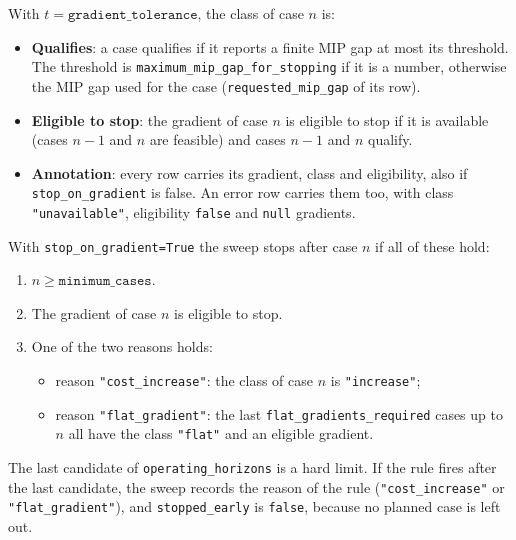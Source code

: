 With $t = \texttt{gradient\_tolerance}$, the class of case $n$ is:
\tabend

\begin{itemize}[nosep,leftmargin=1.5em]
  \item \textbf{Qualifies}: a case qualifies if it reports a finite MIP gap at most its threshold. The threshold is \texttt{maximum\_mip\_gap\_for\_stopping} if it is a number, otherwise the MIP gap used for the case (\texttt{requested\_mip\_gap} of its row).
  \item \textbf{Eligible to stop}: the gradient of case $n$ is eligible to stop if it is available (cases $n-1$ and $n$ are feasible) and cases $n-1$ and $n$ qualify.
  \item \textbf{Annotation}: every row carries its gradient, class and eligibility, also if \texttt{stop\_on\_gradient} is false. An error row carries them too, with class \texttt{"unavailable"}, eligibility \texttt{false} and \texttt{null} gradients.
\end{itemize}

With \texttt{stop\_on\_gradient=True} the sweep stops after case $n$ if all of these hold:
\begin{enumerate}[nosep,label=\arabic*.]
  \item $n \ge \texttt{minimum\_cases}$.
  \item The gradient of case $n$ is eligible to stop.
  \item One of the two reasons holds:
    \begin{itemize}[nosep]
      \item reason \texttt{"cost\_increase"}: the class of case $n$ is \texttt{"increase"};
      \item reason \texttt{"flat\_gradient"}: the last \texttt{flat\_gradients\_required} cases up to $n$ all have the class \texttt{"flat"} and an eligible gradient.
    \end{itemize}
\end{enumerate}
The last candidate of \texttt{operating\_horizons} is a hard limit. If the rule fires after the last candidate, the sweep records the reason of the rule (\texttt{"cost\_increase"} or \texttt{"flat\_gradient"}), and \texttt{stopped\_early} is \texttt{false}, because no planned case is left out.

